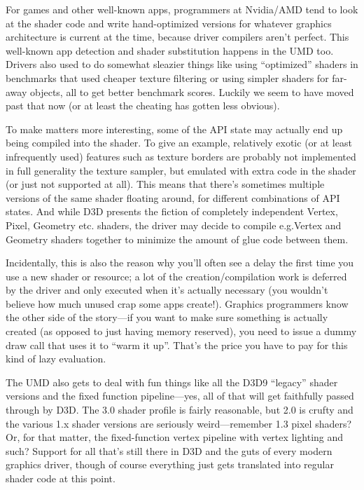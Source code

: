 For games and other well-known apps, programmers at Nvidia/AMD tend to look at 
the shader code and write hand-optimized versions for whatever graphics 
architecture is current at the time, because driver compilers aren't perfect.  
This well-known app detection and shader substitution happens in the UMD too.  
Drivers also used to do somewhat sleazier things like using ``optimized'' 
shaders in benchmarks that used cheaper texture filtering or using simpler 
shaders for far-away objects, all to get better benchmark scores. Luckily we 
seem to have moved past that now (or at least the cheating has gotten less 
obvious).

To make matters more interesting, some of the API state may actually end up 
being compiled into the shader. To give an example, relatively exotic (or at 
least infrequently used) features such as texture borders are probably not 
implemented in full generality the texture sampler, but emulated with extra
code in the shader (or just not supported at all). This means that there's 
sometimes multiple versions of the same shader floating around, for different 
combinations of API states. And while D3D presents the fiction of completely 
independent Vertex, Pixel, Geometry etc. shaders, the driver may decide to 
compile e.g.\@ Vertex and Geometry shaders together to minimize the amount of 
glue code between them.

Incidentally, this is also the reason why you'll often see a delay the first
time you use a new shader or resource; a lot of the creation/compilation work
is deferred by the driver and only executed when it's actually necessary (you
wouldn't believe how much unused crap some apps create!). Graphics programmers
know the other side of the story---if you want to make sure something is
actually created (as opposed to just having memory reserved), you need to issue
a dummy draw call that uses it to ``warm it up''. That's the price you have to 
pay for this kind of lazy evaluation.

The UMD also gets to deal with fun things like all the D3D9 ``legacy'' shader 
versions and the fixed function pipeline---yes, all of that
will get faithfully passed through by D3D. The 3.0 shader profile is fairly 
reasonable,  but 2.0 is crufty and the various 1.x
shader versions are seriously weird---remember 1.3 pixel shaders? Or, for that
matter, the fixed-function vertex pipeline with vertex lighting and such?  
Support for all that's still there in D3D and the guts of every modern graphics
driver, though of course everything just gets translated into regular shader 
code at this point.

